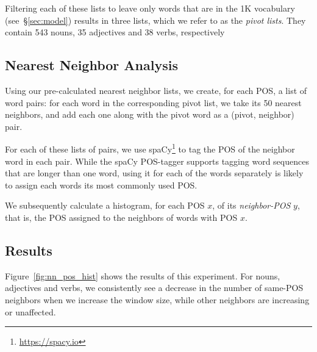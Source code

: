 \documentclass[11pt,a4paper]{article}
\begin{document}
    Filtering each of these lists to leave only words that are in
    the 1K vocabulary (see~\S\ref{sec:model}) results in three lists,
    which we refer to as the \textit{pivot lists}.
    They contain 543 nouns, 35 adjectives and 38 verbs, respectively
    
    \subsection{Nearest Neighbor Analysis}\label{sec:nn_analysis}
    
    Using our pre-calculated nearest neighbor lists, we create, for each
    POS, a list of word pairs: for each word in the corresponding pivot list,
    we take its 50 nearest neighbors, and add each one along with the pivot word
    as a (pivot, neighbor) pair.
    
    For each of these lists of pairs, we use spaCy\footnote{\url{https://spacy.io}}
    to tag the POS of the neighbor word in each pair.
    While the spaCy POS-tagger supports tagging word sequences that are longer
    than one word, using it for each of the words separately is likely
    to assign each words its most commonly used POS.
    
    We subsequently calculate a histogram, for each POS $x$, of its
    \textit{neighbor-POS} $y$, that is, the POS assigned to the neighbors of
    words with POS $x$.
    
    \subsection{Results}\label{sec:nn_results}
    
    Figure~\ref{fig:nn_pos_hist} shows the results of this experiment.
    For nouns, adjectives and verbs, we consistently see a decrease in
    the number of same-POS neighbors when we increase the window size,
    while other neighbors are increasing or unaffected.
    
\end{document}
